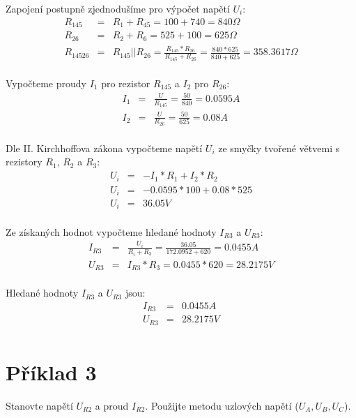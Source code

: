 \documentclass[a4paper,oneside,12pt]{article}
\begin{document}
	Zapojení postupně zjednodušíme pro výpočet napětí $U_{i}$:
	\begin{eqnarray*}
		R_{145} &= & R_{1} + R_{45} = 100 + 740 = 840 \Omega\\
		R_{26} &= & R_{2} + R_{6} = 525 + 100 = 625 \Omega\\
		R_{14526} &= & R_{145} || R_{26} = \frac{R_{145} * R_{26}}{R_{145} + R_{26}} = \frac{840 * 625}{840 + 625} = 358.3617 \Omega\\
	\end{eqnarray*}

	Vypočteme proudy $I_{1}$ pro rezistor $R_{145}$ a $I_{2}$ pro $R_{26}$:
	\begin{eqnarray*}
		I_{1} &= & \frac{U}{R_{145}} = \frac{50}{840} = 0.0595 A\\
		I_{2} &= & \frac{U}{R_{26}} = \frac{50}{625} = 0.08 A\\
	\end{eqnarray*}

	Dle II. Kirchhoffova zákona vypočteme napětí $U_{i}$ ze smyčky tvořené větvemi s rezistory $R_{1}$, $R_{2}$ a $R_{3}$:
	\begin{eqnarray*}
		U_{i} &= & - I_{1} * R_{1} + I_{2} * R_{2} \\
		U_{i} &= & - 0.0595 * 100 + 0.08 * 525 \\
		U_{i} &= & 36.05 V\\
	\end{eqnarray*}

	Ze získaných hodnot vypočteme hledané hodnoty $I_{R3}$ a $U_{R3}$:
	\begin{eqnarray*}
		I_{R3} &= & \frac{U_{i}}{R_{i} + R_{3}} = \frac{36.05}{172.0952 + 620} = 0.0455 A\\
		U_{R3} &= & I_{R3} * R_{3} = 0.0455 * 620 = 28.2175 V\\
	\end{eqnarray*}

	Hledané hodnoty $I_{R3}$ a $U_{R3}$ jsou:
	\begin{eqnarray*}
		I_{R3} &= & 0.0455 A\\
		U_{R3} &= & 28.2175 V\\
	\end{eqnarray*}

	\newpage

	\section{Příklad 3}

	Stanovte napětí $U_{R2}$ a proud $I_{R2}$. Použijte metodu uzlových napětí ($U_{A}, U_{B}, U_{C}$).
\end{document}

